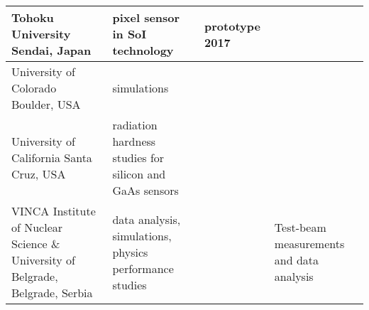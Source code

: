 \begin{landscape}
\begin{sidewaystable}
\begin{adjustbox}{max width=1.1\textwidth,totalheight=1\textheight}
\begin{tabularx}{1.1\textheight}{XXXX}
     \midrule
     Tohoku University Sendai, Japan &
     pixel sensor in SoI technology &
     prototype 2017 & \\
     \midrule
     University of Colorado Boulder, USA &
     simulations & & \\
     \midrule
     University of California Santa Cruz, USA &
     radiation hardness studies for silicon and GaAs sensors & & \\
     \midrule
     VINCA Institute of Nuclear Science \& University of Belgrade, Belgrade, Serbia &
     data analysis, simulations, physics performance studies &
     & Test-beam measurements and data analysis\\
    \bottomrule
\end{tabularx}
\end{adjustbox}
\end{sidewaystable}
\end{landscape}
\restoregeometry
